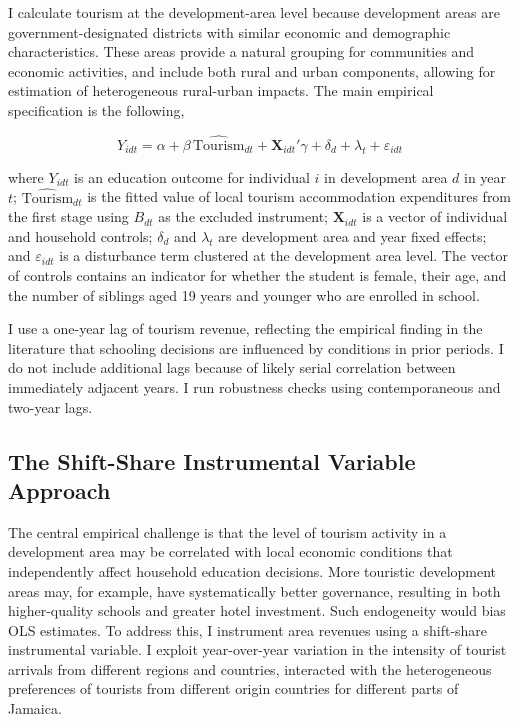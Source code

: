 \documentclass[12pt]{article}
\begin{document}
	I calculate tourism at the development-area level because development areas are government-designated districts with similar economic and demographic characteristics. These areas provide a natural grouping for communities and economic activities, and include both rural and urban components, allowing for estimation of heterogeneous rural-urban impacts.
	The main empirical specification is the following,
	
	\begin{equation}
		Y_{idt} = \alpha + \beta \, \widehat{\text{Tourism}}_{dt} + \mathbf{X}_{idt}' \gamma + \delta_d + \lambda_t + \varepsilon_{idt}
		\label{eq:second_stage}
	\end{equation}
	
		\noindent where $Y_{idt}$ is an education outcome for individual $i$ in development area $d$ in year $t$; $\widehat{\text{Tourism}}_{dt}$ is the fitted value of local tourism accommodation expenditures from the first stage using $B_{dt}$ as the excluded instrument; $\mathbf{X}_{idt}$ is a vector of individual and household controls; $\delta_d$ and $\lambda_t$ are development area and year fixed effects; and $\varepsilon_{idt}$ is a disturbance term clustered at the development area level. The vector of controls contains an indicator for whether the student is female, their age, and the number of siblings aged 19 years and younger who are enrolled in school.

	I use a one-year lag of tourism revenue, reflecting the empirical finding in the literature that schooling decisions are influenced by conditions in prior periods. I do not include additional lags because of likely serial correlation between immediately adjacent years. I run robustness checks using contemporaneous and two-year lags.
	
		\subsection{The Shift-Share Instrumental Variable Approach}
	\label{subsec:iv_approach}
	
	The central empirical challenge is that the level of tourism activity in a development area may be correlated with local economic conditions that independently affect household education decisions. More touristic development areas may, for example, have systematically better governance, resulting in both higher-quality schools and greater hotel investment. Such endogeneity would bias OLS estimates. To address this, I instrument area revenues using a shift-share instrumental variable. I exploit year-over-year variation in the intensity of tourist arrivals from different regions and countries, interacted with the heterogeneous preferences of tourists from different origin countries for different parts of Jamaica.
	
\end{document}
